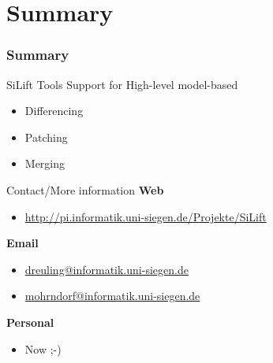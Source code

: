 \section{Summary}
\begin{frame}
  \frametitle{Summary}
  \begin{block}{SiLift Tools}
  Support for High-level model-based
  \begin{itemize}
    \item Differencing
    \item Patching
    \item Merging
  \end{itemize}
  \end{block}
  \begin{block}{Contact/More information}
  \textbf{Web}
  \begin{itemize}
    \item \url{http://pi.informatik.uni-siegen.de/Projekte/SiLift}
  \end{itemize}
  \textbf{Email}
  \begin{itemize}
    \item \url{dreuling@informatik.uni-siegen.de} 
    \item \url{mohrndorf@informatik.uni-siegen.de} 
  \end{itemize}
  \textbf{Personal}
  \begin{itemize}
    \item Now ;-)
  \end{itemize}
  \end{block}
\end{frame}

